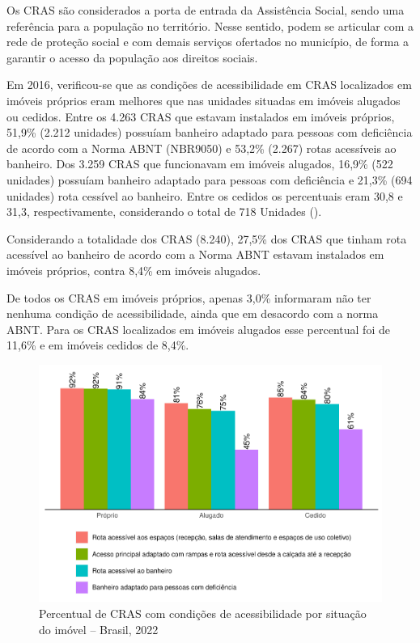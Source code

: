 \documentclass[
  brazilian]{report}
\begin{document}
Os CRAS são considerados a porta de entrada da Assistência Social, sendo
uma referência para a população no território. Nesse sentido, podem se
articular com a rede de proteção social e com demais serviços ofertados
no município, de forma a garantir o acesso da população aos direitos
sociais.

Em 2016, verificou-se que as condições de acessibilidade em CRAS
localizados em imóveis próprios eram melhores que nas unidades situadas
em imóveis alugados ou cedidos. Entre os 4.263 CRAS que estavam
instalados em imóveis próprios, 51,9\% (2.212 unidades) possuíam
banheiro adaptado para pessoas com deficiência de acordo com a Norma
ABNT (NBR9050) e 53,2\% (2.267) rotas acessíveis ao banheiro. Dos 3.259
CRAS que funcionavam em imóveis alugados, 16,9\% (522 unidades) possuíam
banheiro adaptado para pessoas com deficiência e 21,3\% (694 unidades)
rota cessível ao banheiro. Entre os cedidos os percentuais eram 30,8 e
31,3, respectivamente, considerando o total de 718 Unidades
().

Considerando a totalidade dos CRAS (8.240), 27,5\% dos CRAS que tinham
rota acessível ao banheiro de acordo com a Norma ABNT estavam instalados
em imóveis próprios, contra 8,4\% em imóveis alugados.

De todos os CRAS em imóveis próprios, apenas 3,0\% informaram não ter
nenhuma condição de acessibilidade, ainda que em desacordo com a norma
ABNT. Para os CRAS localizados em imóveis alugados esse percentual foi
de 11,6\% e em imóveis cedidos de 8,4\%.

\begin{figure}
\includegraphics{Censo-SUAS-2022_files/figure-latex/CRAS-acessibilidade-situacao-1} \caption[Percentual de CRAS com condições de acessibilidade por situação do imóvel – Brasil, 2022]{Percentual de CRAS com condições de acessibilidade por situação do imóvel – Brasil, 2022}\label{fig:CRAS-acessibilidade-situacao}
\end{figure}
\end{document}
